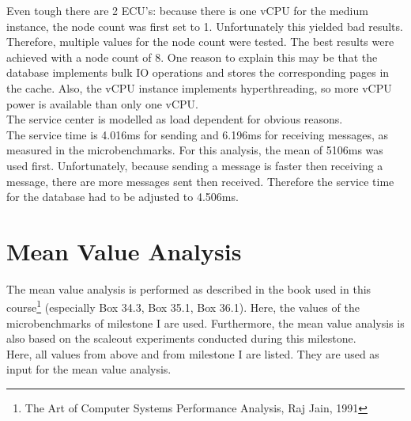 \documentclass[a4paper]{article}
\begin{document}
{Even tough there are 2 ECU's: because there is one vCPU for the medium instance, the node count was first set to 1. Unfortunately this yielded bad results. Therefore, multiple values for the node count were tested. The best results were achieved with a node count of 8. One reason to explain this may be that the database implements bulk IO operations and stores the corresponding pages in the cache. Also, the vCPU instance implements hyperthreading, so more vCPU power is available than only one vCPU.\\

The service center is modelled as load dependent for obvious reasons.\\

The service time is 4.016ms for sending and 6.196ms for receiving messages, as measured in the microbenchmarks. For this analysis, the mean of 5106ms was used first. Unfortunately, because sending a message is faster then receiving a message, there are more messages sent then received. Therefore the service time for the database had to be adjusted to 4.506ms.\\




\section{Mean Value Analysis}

The mean value analysis is performed as described in the book used in this course\footnote{The Art of Computer Systems Performance Analysis, Raj Jain, 1991} (especially Box 34.3, Box 35.1, Box 36.1). Here, the values of the microbenchmarks of milestone I are used. Furthermore, the mean value analysis is also based on the scaleout experiments conducted during this milestone.\\



Here, all values from above and from milestone I are listed. They are used as input for the mean value analysis.\\

}
\end{document}
